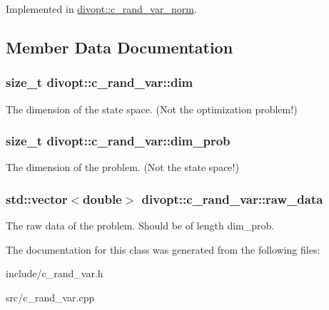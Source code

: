 \-Implemented in \hyperlink{classdivopt_1_1c__rand__var__norm_a74609f0002a3d05501ef3a3896938669}{divopt\-::c\-\_\-rand\-\_\-var\-\_\-norm}.



\subsection{\-Member \-Data \-Documentation}
\hypertarget{classdivopt_1_1c__rand__var_ad263b31b0e272d1c00a7368362ed19e4}{
\subsubsection[{dim}]{\setlength{\rightskip}{0pt plus 5cm}size\-\_\-t {\bf divopt\-::c\-\_\-rand\-\_\-var\-::dim}}}\label{classdivopt_1_1c__rand__var_ad263b31b0e272d1c00a7368362ed19e4}
\-The dimension of the state space. (\-Not the optimization problem!) \hypertarget{classdivopt_1_1c__rand__var_accebcd3c62fcf1958e6d21b82bd0d4ae}{
\subsubsection[{dim\-\_\-prob}]{\setlength{\rightskip}{0pt plus 5cm}size\-\_\-t {\bf divopt\-::c\-\_\-rand\-\_\-var\-::dim\-\_\-prob}}}\label{classdivopt_1_1c__rand__var_accebcd3c62fcf1958e6d21b82bd0d4ae}
\-The dimension of the problem. (\-Not the state space!) \hypertarget{classdivopt_1_1c__rand__var_a5817d4b94c53e6e6a7f8d4027cbce4e1}{
\subsubsection[{raw\-\_\-data}]{\setlength{\rightskip}{0pt plus 5cm}std\-::vector$<$double$>$ {\bf divopt\-::c\-\_\-rand\-\_\-var\-::raw\-\_\-data}}}\label{classdivopt_1_1c__rand__var_a5817d4b94c53e6e6a7f8d4027cbce4e1}
\-The raw data of the problem. \-Should be of length dim\-\_\-prob. 

\-The documentation for this class was generated from the following files\-:\begin{DoxyCompactItemize}
\item 
include/c\-\_\-rand\-\_\-var.\-h\item 
src/c\-\_\-rand\-\_\-var.\-cpp\end{DoxyCompactItemize}
